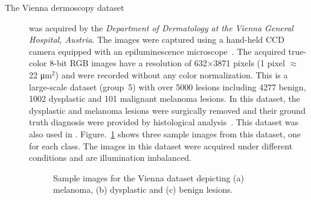 \begin{description}
\item [The Vienna dermoscopy dataset] was acquired by the \textit{Department of Dermatology at the Vienna General Hospital, Austria}.
The images were captured using a hand-held CCD camera equipped with an epiluminescence microscope~\cite{ganster2001automated}.
The acquired  true-color 8-bit RGB images have a resolution of 632$\times$3871 pixels (1 pixel $\approx$ 22 \si{\micro\metre}$^{2}$) and were recorded without any color normalization.
This is a large-scale dataset (group~5) with over 5000 lesions including 4277 benign, 1002 dysplastic and 101 malignant melanoma lesions.
In this dataset, the dysplastic and melanoma lesions were surgically removed and their ground truth diagnosis were provided by histological analysis~\cite{ganster2001automated}. 
This dataset was also used in \cite{torre2010learning,maglogiannis2009overview}. 
Figure.~\ref{fig:Viennasamples} shows three sample images from this dataset, one for each class.
The images in this dataset were acquired under different conditions and are illumination imbalanced.
\begin{figure}
\begin{center}
  \hspace*{\fill}
  \hfill
  \hfill
  \hspace*{\fill}
  \caption[Sample images of the Vienna dataset]{Sample images for the Vienna dataset depicting (a) melanoma, (b) dysplastic and (c) benign lesions.}
  \label{fig:Viennasamples}
\end{center}	
\end{figure}


\end{description}
